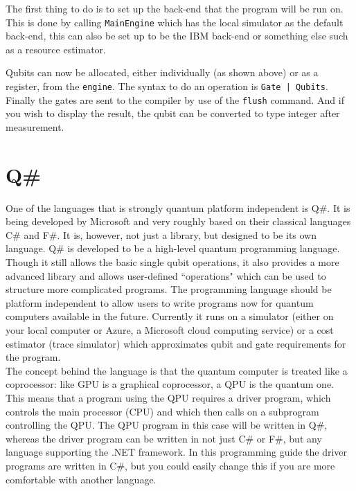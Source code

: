 

The first thing to do is to set up the back-end that the program will be run on. This is done by calling \texttt{MainEngine} which has the local simulator as the default back-end, this can also be set up to be the IBM back-end or something else such as a resource estimator.

Qubits can now be allocated, either individually (as shown above) or as a register, from the \texttt{engine}. The syntax to do an operation is  \texttt{Gate | Qubits}. Finally the gates are sent to the compiler by use of the \texttt{flush} command. And if you wish to display the result, the qubit can be converted to type integer after measurement.


\newpage
\section{Q\#}
One of the languages that is strongly quantum platform independent is Q\#. It is being developed by Microsoft and very roughly based on their classical languages C\# and F\#. It is, however, not just a library, but designed to be its own language. Q\# is developed to be a high-level quantum programming language. Though it still allows the basic single qubit operations, it also provides a more advanced library and allows user-defined ``operations" which can be used to structure more complicated programs. The programming language should be platform independent to allow users to write programs now for quantum computers available in the future. Currently it runs on a simulator (either on your local computer or Azure, a Microsoft cloud computing service) or a cost estimator (trace simulator) which approximates qubit and gate requirements for the program. \\
The concept behind the language is that the quantum computer is treated like a coprocessor: like GPU is a graphical coprocessor, a QPU is the quantum one. This means that a program using the QPU requires a driver program, which controls the main processor (CPU) and which then calls on a subprogram controlling the QPU. The QPU program in this case will be written in Q\#, whereas the driver program can be written in not just C\# or F\#, but any language supporting the .NET framework. In this programming guide the driver programs are written in C\#, but you could easily change this if you are more comfortable with another language.\\

